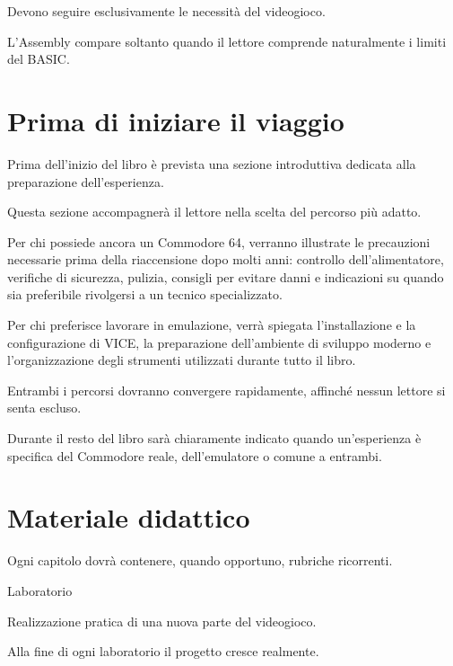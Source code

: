 \documentclass{article}
\begin{document}
Devono seguire esclusivamente le necessità del videogioco.

L'Assembly compare soltanto quando il lettore comprende naturalmente i limiti del BASIC.



\section{Prima di iniziare il viaggio}
Prima dell'inizio del libro è prevista una sezione introduttiva dedicata alla preparazione dell'esperienza.

Questa sezione accompagnerà il lettore nella scelta del percorso più adatto.

Per chi possiede ancora un Commodore 64, verranno illustrate le precauzioni necessarie prima della riaccensione dopo
molti anni: controllo dell'alimentatore, verifiche di sicurezza, pulizia, consigli per evitare danni e indicazioni su
quando sia preferibile rivolgersi a un tecnico specializzato.

Per chi preferisce lavorare in emulazione, verrà spiegata l'installazione e la configurazione di VICE, la preparazione
dell'ambiente di sviluppo moderno e l'organizzazione degli strumenti utilizzati durante tutto il libro.

Entrambi i percorsi dovranno convergere rapidamente, affinché nessun lettore si senta escluso.

Durante il resto del libro sarà chiaramente indicato quando un'esperienza è specifica del Commodore reale,
dell'emulatore o comune a entrambi.



\section{Materiale didattico}
Ogni capitolo dovrà contenere, quando opportuno, rubriche ricorrenti.

Laboratorio

Realizzazione pratica di una nuova parte del videogioco.

Alla fine di ogni laboratorio il progetto cresce realmente.
\end{document}

